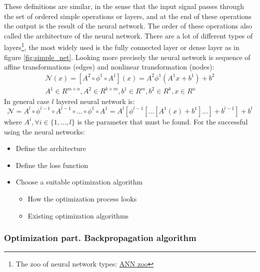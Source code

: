 These definitions are similar, in the sense that the input signal passes through the set of ordered simple operations or layers, and at the end of these operations the output is the result of the neural network. The order of these operations also called the architecture of the neural network. There are a lot of different types of layers\footnote{The zoo of neural network types: \href{https://www.asimovinstitute.org/neural-network-zoo/}{ANN zoo}}, the most widely used is the fully connected layer or dense layer as in figure \ref{fig:simple_net}.
Looking more precisely the neural network is sequence of affine transformations (edges) and nonlinear transformation (nodes):
\begin{equation*}
	\begin{multlined}
		\mathcal{N}(x) = \left [ A^2 \circ \phi^1 \circ A^1 \right ] (x) = A^2 \phi^1 \left (A^1 x + b^1 \right ) + b^2 \\ A^1 \in R^{m \times n}, A^2 \in R^{k \times m}, b^1 \in R^m, b^2 \in R^k, x \in R^n
	\end{multlined}
\end{equation*}
In general case $l$ layered neural network is:
\begin{equation}
	\label{eq:neural_net}
	\mathcal{N} = A^l \circ \phi^{l - 1} \circ A^{l - 1} \circ \dots \circ \phi^1 \circ A^1 = A^l \left [ \phi^{l - 1} \left [ \dots \left [ A^1 (x) + b^1 \right ] \dots \right ] + b^{l - 1} \right] + b^l
\end{equation}
where $A^i, \forall i \in \{1, \dots, l\}$ is the parameter that must be found. For the successful using the neural networks:
\begin{itemize}
	\item Define the architecture
	\item Define the loss function
	\item Choose a suitable optimization algorithm \begin{itemize}
		\item How the optimization process looks
		\item Existing optimization algorithms
	\end{itemize}
\end{itemize}

\subsubsection{Optimization part. Backpropagation algorithm}

